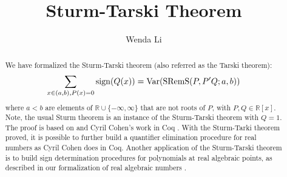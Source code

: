 \documentclass[11pt,a4paper]{article}
\begin{document}
\title{Sturm-Tarski Theorem}
\author{Wenda Li}
\maketitle

\begin{abstract}
  We have formalized the Sturm-Tarski theorem (also referred as the Tarski theorem): \[\sum_{x \in (a,b),P(x)=0} {\rm sign}(Q(x)) = {\rm Var}({\rm SRemS}(P,P'Q;a,b))\] 
  where $a<b$ are elements of $\mathbb{R} \cup \{-\infty,\infty\}$ that are not roots of $P$, with $P,Q \in \mathbb{R}[x]$. Note, 
  the usual Sturm theorem is an instance of the Sturm-Tarski theorem with $Q=1$. The proof is based on \cite{Basu:2006:ARA:1197095} and Cyril Cohen's work in Coq \cite{cohen_phd}. With the Sturm-Tarki theorem proved, it is possible to further build a quantifier elimination procedure for real numbers as Cyril Cohen does in Coq.
  Another application of the Sturm-Tarski theorem is to build sign determination procedures for polynomials at real algebraic points, as described in our formalization of real algebraic numbers \cite{Li_CPP_16}.
\end{abstract}






\end{document}
